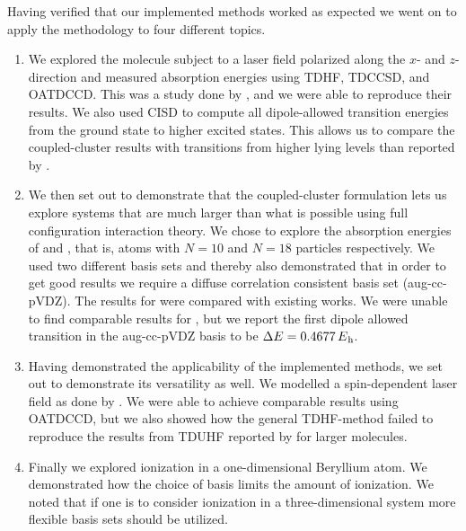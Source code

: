     Having verified that our implemented methods worked as expected we went on
    to apply the methodology to four different topics.
    \begin{enumerate}
        \item We explored the  molecule subject to a laser field
            polarized along the $x$- and $z$-direction and measured absorption
            energies using TDHF, TDCCSD, and OATDCCD.
            This was a study done by \citeauthor{nest} \cite{nest}, and we were
            able to reproduce their results.
            We also used CISD to compute all dipole-allowed transition energies
            from the ground state to higher excited states.
            This allows us to compare the coupled-cluster results with
            transitions from higher lying levels than reported by
            \citeauthor{nest} \cite{nest}.
        \item We then set out to demonstrate that the coupled-cluster
            formulation lets us explore systems that are much larger than what
            is possible using full configuration interaction theory.
            We chose to explore the absorption energies of  and ,
            that is, atoms with $N = 10$ and $N = 18$ particles respectively.
            We used two different basis sets and thereby also demonstrated that
            in order to get good results we require a diffuse correlation
            consistent basis set (aug-cc-pVDZ).
            The results for  were compared with existing works.
            We were unable to find comparable results for , but we report
            the first dipole allowed transition in the aug-cc-pVDZ basis to be
            $\Delta\energy = \SI{0.4677}{\hartree}$.
        \item Having demonstrated the applicability of the implemented methods,
            we set out to demonstrate its versatility as well.
            We modelled a spin-dependent laser field as done by
            \citeauthor{isborn} \cite{isborn}.
            We were able to achieve comparable results using OATDCCD, but we
            also showed how the general TDHF-method failed to reproduce the
            results from TDUHF reported by \citeauthor{isborn} \cite{isborn} for
            larger molecules.
        \item Finally we explored ionization in a one-dimensional Beryllium
            atom.
            We demonstrated how the choice of basis limits the amount of
            ionization.
            We noted that if one is to consider ionization in a
            three-dimensional system more flexible basis sets should be
            utilized.
    \end{enumerate}
